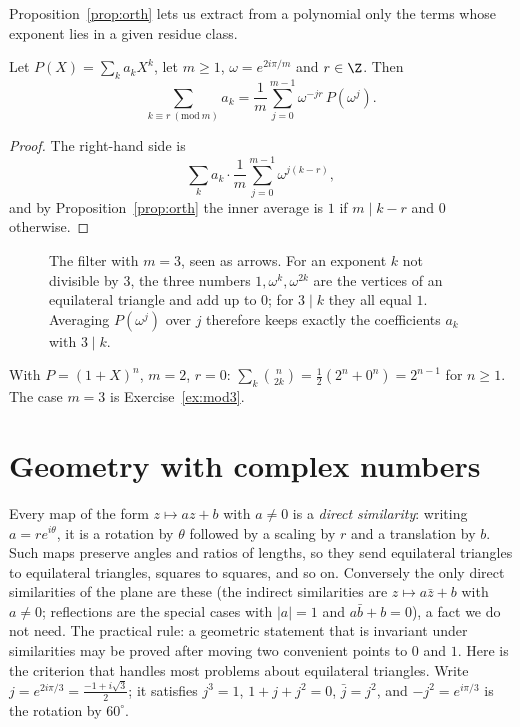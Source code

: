 Proposition~\ref{prop:orth} lets us extract from a polynomial only the terms whose exponent lies in a given residue class.

\begin{theorem}\label{thm:filter}
Let $P(X)=\sum_k a_kX^k$, let $m\ge1$, $\omega=e^{2i\pi/m}$ and $r\in\Z$. Then
\[
\sum_{k\equiv r\ (\mathrm{mod}\ m)}a_k=\frac1m\sum_{j=0}^{m-1}\omega^{-jr}\,P\!\left(\omega^j\right).
\]
\end{theorem}
\begin{proof}
The right-hand side is
\[
\sum_ka_k\cdot\frac1m\sum_{j=0}^{m-1}\omega^{j(k-r)},
\]
and by Proposition~\ref{prop:orth} the inner average is $1$ if $m\mid k-r$ and $0$ otherwise.
\end{proof}

\begin{figure}[ht]
\centering
{}
\caption{The filter with $m=3$, seen as arrows. For an exponent $k$ not divisible by $3$, the three numbers $1,\omega^k,\omega^{2k}$ are the vertices of an equilateral triangle and add up to $0$; for $3\mid k$ they all equal $1$. Averaging $P(\omega^j)$ over $j$ therefore keeps exactly the coefficients $a_k$ with $3\mid k$.}
\label{fig:filter}
\end{figure}

\begin{example}
With $P=(1+X)^n$, $m=2$, $r=0$: $\sum_k\binom n{2k}=\frac12\left(2^n+0^n\right)=2^{n-1}$ for $n\ge1$.
The case $m=3$ is Exercise~\ref{ex:mod3}.
\end{example}

\section{Geometry with complex numbers}

Every map of the form $z\mapsto az+b$ with $a\ne0$ is a \emph{direct similarity}: writing $a=re^{i\theta}$, it is a rotation by $\theta$ followed by a
scaling by $r$ and a translation by $b$. Such maps preserve angles and ratios of lengths, so they send equilateral triangles to equilateral triangles,
squares to squares, and so on. Conversely the only direct similarities of the plane are these (the indirect similarities are $z\mapsto a\bar z+b$ with $a\ne0$; reflections are the special cases with $|a|=1$ and $a\bar b+b=0$), a fact we do not need.
The practical rule: a geometric statement that is invariant under similarities may be proved after moving two convenient points to $0$ and $1$.
Here is the criterion that handles most problems about equilateral triangles. Write $j=e^{2i\pi/3}=\frac{-1+i\sqrt3}2$; it satisfies $j^3=1$, $1+j+j^2=0$, $\bar j=j^2$,
and $-j^2=e^{i\pi/3}$ is the rotation by $60^\circ$.

